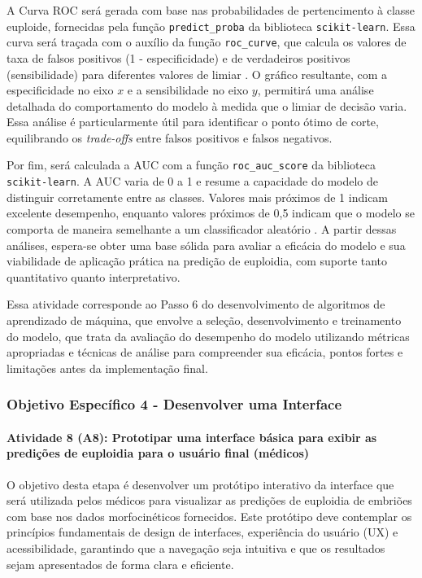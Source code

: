 A Curva ROC será gerada com base nas probabilidades de pertencimento à classe euploide, fornecidas pela função \texttt{predict\_proba} da biblioteca \texttt{scikit-learn}. Essa curva será traçada com o auxílio da função \texttt{roc\_curve}, que calcula os valores de taxa de falsos positivos (1 - especificidade) e de verdadeiros positivos (sensibilidade) para diferentes valores de limiar \cite{vilela2022}. O gráfico resultante, com a especificidade no eixo \(x\) e a sensibilidade no eixo \(y\), permitirá uma análise detalhada do comportamento do modelo à medida que o limiar de decisão varia. Essa análise é particularmente útil para identificar o ponto ótimo de corte, equilibrando os \textit{trade-offs} entre falsos positivos e falsos negativos.

Por fim, será calculada a AUC com a função \texttt{roc\_auc\_score} da biblioteca \texttt{scikit-learn}. A AUC varia de 0 a 1 e resume a capacidade do modelo de distinguir corretamente entre as classes. Valores mais próximos de 1 indicam excelente desempenho, enquanto valores próximos de 0{,}5 indicam que o modelo se comporta de maneira semelhante a um classificador aleatório \cite{vilela2022}. A partir dessas análises, espera-se obter uma base sólida para avaliar a eficácia do modelo e sua viabilidade de aplicação prática na predição de euploidia, com suporte tanto quantitativo quanto interpretativo.

Essa atividade corresponde ao Passo 6 do desenvolvimento de algoritmos de aprendizado de máquina, que envolve a seleção, desenvolvimento e treinamento do modelo, que trata da avaliação do desempenho do modelo utilizando métricas apropriadas e técnicas de análise para compreender sua eficácia, pontos fortes e limitações antes da implementação final.

\subsubsection{\textbf{Objetivo Específico 4} - Desenvolver uma Interface}

\paragraph{\textbf{Atividade 8 (A8):} Prototipar uma interface básica para exibir as predições de euploidia para o usuário final (médicos)}

O objetivo desta etapa é desenvolver um protótipo interativo da interface que será utilizada pelos médicos para visualizar as predições de euploidia de embriões com base nos dados morfocinéticos fornecidos. Este protótipo deve contemplar os princípios fundamentais de design de interfaces, experiência do usuário (UX) e acessibilidade, garantindo que a navegação seja intuitiva e que os resultados sejam apresentados de forma clara e eficiente.

